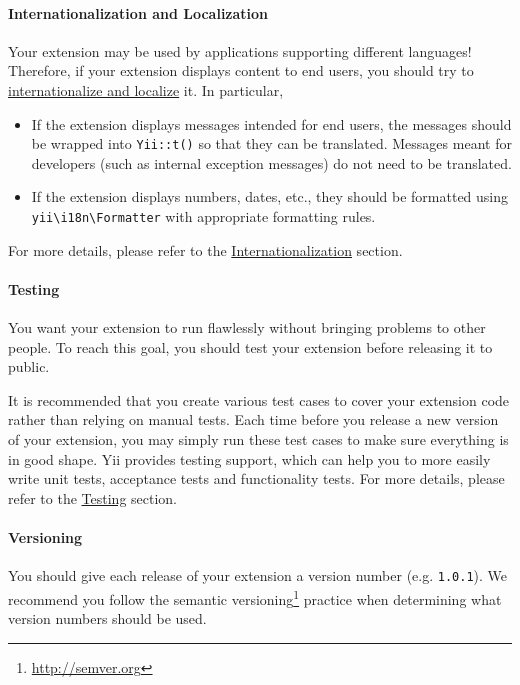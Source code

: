 \paragraph{Internationalization and Localization \label{structure-extensions.md::i18n-l10n}}
Your extension may be used by applications supporting different languages! Therefore, if your extension displays
content to end users, you should try to \hyperref[tutorial-i18n.md]{internationalize and localize} it. In particular,

\begin{itemize}
\item If the extension displays messages intended for end users, the messages should be wrapped into \lstinline|Yii::t()|
so that they can be translated. Messages meant for developers (such as internal exception messages) do not need
to be translated.
\item If the extension displays numbers, dates, etc., they should be formatted using \texttt{yii{\allowbreak{}\textbackslash}i18n{\allowbreak{}\textbackslash}Formatter} with
appropriate formatting rules.
\end{itemize}
For more details, please refer to the \hyperref[tutorial-i18n.md]{Internationalization} section.

\paragraph{Testing \label{structure-extensions.md::testing}}
You want your extension to run flawlessly without bringing problems to other people. To reach this goal, you should
test your extension before releasing it to public.

It is recommended that you create various test cases to cover your extension code rather than relying on manual tests.
Each time before you release a new version of your extension, you may simply run these test cases to make sure
everything is in good shape. Yii provides testing support, which can help you to more easily write unit tests,
acceptance tests and functionality tests. For more details, please refer to the \hyperref[test-overview.md]{Testing} section.

\paragraph{Versioning \label{structure-extensions.md::versioning}}
You should give each release of your extension a version number (e.g. \lstinline|1.0.1|). We recommend you follow the
semantic versioning\footnote{\url{http://semver.org}} practice when determining what version numbers should be used.

